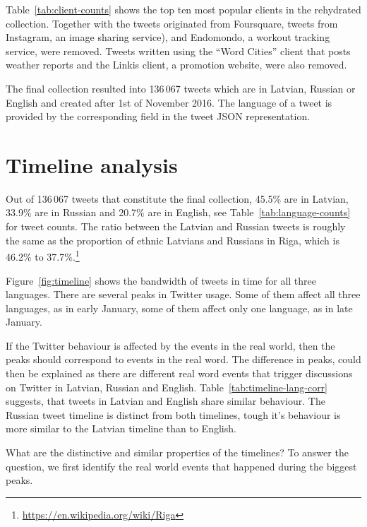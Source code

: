 \documentclass[11pt,a4paper]{article}
\begin{document}


Table~\ref{tab:client-counts} shows the top ten most popular clients in the rehydrated collection. Together with the tweets originated from Foursquare, tweets from Instagram, an image sharing service), and Endomondo, a workout tracking service, were removed. Tweets written using the ``Word Cities'' client that posts weather reports and the Linkis client, a promotion website, were also removed.

The final collection resulted into 136\,067 tweets which are in Latvian, Russian or English and created after 1st of November 2016. The language of a tweet is provided by the corresponding field in the tweet JSON representation.

\section{Timeline analysis}
\label{sec:timeline}

Out of 136\,067 tweets that constitute the final collection, 45.5\% are in Latvian, 33.9\% are in Russian and 20.7\% are in English, see Table~\ref{tab:language-counts} for tweet counts. The ratio between the Latvian and Russian tweets is roughly the same as the proportion of ethnic Latvians and Russians in Riga, which is 46.2\% to 37.7\%.\footnote{\url{https://en.wikipedia.org/wiki/Riga}}



Figure~\ref{fig:timeline} shows the bandwidth of tweets in time for all three languages. There are several peaks in Twitter usage. Some of them affect all three languages, as in early January, some of them affect only one language, as in late January.

If the Twitter behaviour is affected by the events in the real world, then the peaks should correspond to events in the real word. The difference in peaks, could then be explained as there are different real word events that trigger discussions on Twitter in Latvian, Russian and English. Table~\ref{tab:timeline-lang-corr} suggests, that tweets in Latvian and English share similar behaviour. The Russian tweet timeline is distinct from both timelines, tough it's behaviour is more similar to the Latvian timeline than to English.



What are the distinctive and similar properties of the timelines? To answer the question, we first identify the real world events that happened during the biggest peaks.
\end{document}
